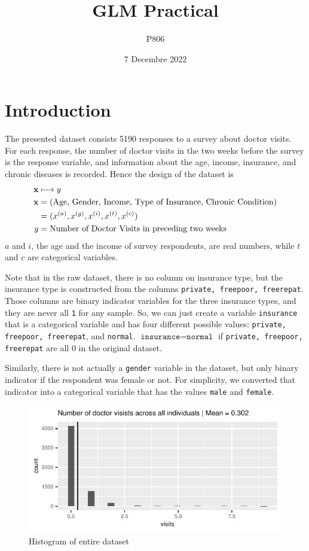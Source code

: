 \documentclass[a4paper,11pt]{article}
\title{GLM Practical}
\author{P806}
\date{7 Decembre 2022}
\begin{document}
\maketitle

\section{Introduction}
The presented dataset consists 5190 responses to a survey about doctor visits. For each response, the number of doctor visits in the two weeks before the survey is the response variable, and information about the age, income, insurance, and chronic diseases is recorded. Hence the design of the dataset is
\begin{align*}
\centering
\mathbf{x}  & \longmapsto y \\
\mathbf{x} &= (\text{Age, Gender, Income, Type of Insurance, Chronic Condition}) \\
 &= (x^{(a)}, x^{(g)}, x^{(i)}, x^{(t)}, x^{(c)}) \\
y &= \text{Number of Doctor Visits in preceding two weeks}
\end{align*}
$a$ and $i$, the age and the income of survey respondents, are real numbers, while $t$ and $c$ are categorical variables.

Note that in the raw dataset, there is no column on insurance type, but the insurance type is constructed from the columns \texttt{private, freepoor, freerepat}. Those columns are binary indicator variables for the three insurance types, and they are never all \texttt{1} for any sample. So, we can just create a variable \texttt{insurance} that is a categorical variable and has four different possible values: \texttt{private, freepoor, freerepat}, and \texttt{normal}. $\texttt{insurance} = \texttt{normal}$  if \texttt{private, freepoor, freerepat} are all $0$ in the original dataset.

Similarly, there is not actually a \texttt{gender} variable in the dataset, but only binary indicator if the respondent was female or not. For simplicity, we converted that indicator into a categorical variable that has the values \texttt{male} and \texttt{female}.
\begin{figure}[h]
	\centering
	\includegraphics{../plots/histogram_of_visits.pdf}
	\caption{Histogram of entire dataset}
	\label{fig:hist_all}
\end{figure}
\end{document}
